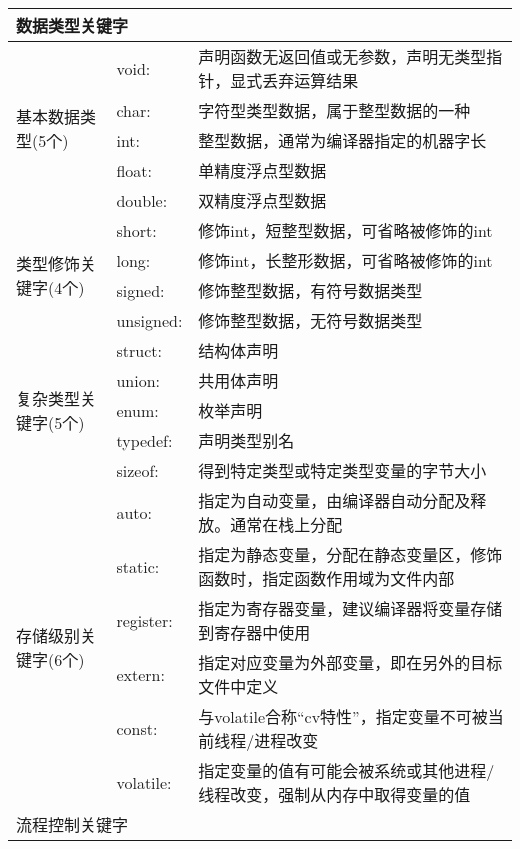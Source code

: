 \begin{table}[htbp]
\begin{center}
\small{\begin{tabular}{|l|l|l|}
\hline  
\multicolumn{3}{|l|}{数据类型关键字} \\ \hline

\multirow{5}{*}{基本数据类型(5个)}    & void: & 声明函数无返回值或无参数，声明无类型指针，显式丢弃运算结果 \\
& char: & 字符型类型数据，属于整型数据的一种 \\  
& int: & 整型数据，通常为编译器指定的机器字长 \\ 
& float: & 单精度浮点型数据 \\  
& double: & 双精度浮点型数据 \\ \hline
                               
\multirow{4}{*}{类型修饰关键字(4个)}  &  short: & 修饰int，短整型数据，可省略被修饰的int \\
& long: & 修饰int，长整形数据，可省略被修饰的int  \\ 
& signed: & 修饰整型数据，有符号数据类型 \\ 
& unsigned: & 修饰整型数据，无符号数据类型 \\ \hline

\multirow{5}{*}{复杂类型关键字(5个)}  &  struct: & 结构体声明 \\
& union: & 共用体声明  \\ 
& enum: & 枚举声明 \\ 
& typedef: & 声明类型别名 \\ 
& sizeof: & 得到特定类型或特定类型变量的字节大小 \\ \hline
			
\multirow{6}{*}{存储级别关键字(6个)}  & auto: & 指定为自动变量，由编译器自动分配及释放。通常在栈上分配 \\ 
& static: & 指定为静态变量，分配在静态变量区，修饰函数时，指定函数作用域为文件内部 \\  
& register: & 指定为寄存器变量，建议编译器将变量存储到寄存器中使用 \\  
& extern: & 指定对应变量为外部变量，即在另外的目标文件中定义\\  
& const: & 与volatile合称“cv特性”，指定变量不可被当前线程/进程改变 \\ 
& volatile: & 指定变量的值有可能会被系统或其他进程/线程改变，强制从内存中取得变量的值 \\  \hline

\multicolumn{3}{|l|}{流程控制关键字}  \\  \hline


\end{tabular}}
\end{center}
\end{table}
